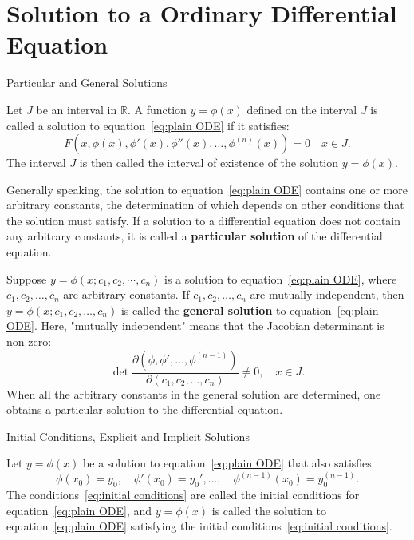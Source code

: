 \documentclass[11pt]{elegantbook}
\begin{document}
\section{Solution to a Ordinary Differential Equation}
\begin{leftbarTitle}{Particular and General Solutions}\end{leftbarTitle}
Let $J$ be an interval in $\mathbb{R}$. 
A function $y=\phi(x)$ defined on the interval $J$ is called a solution to equation~\eqref{eq:plain ODE} if it satisfies: 
\[
F(x, \phi(x), \phi'(x), \phi''(x), \dots, \phi^{(n)}(x)) = 0 \quad x \in J. 
\]
The interval $J$ is then called the interval of existence of the solution $y = \phi(x)$.

Generally speaking, 
the solution to equation~\eqref{eq:plain ODE} contains one or more arbitrary constants, 
the determination of which depends on other conditions that the solution must satisfy. 
If a solution to a differential equation does not contain any arbitrary constants, 
it is called a \textbf{particular solution} of the differential equation.

Suppose $y = \phi(x; c_{1}, c_{2}, \cdots, c_{n})$ is a solution to equation~\eqref{eq:plain ODE}, 
where $c_{1}, c_{2}, \ldots, c_{n}$ are arbitrary constants. 
If $c_{1}, c_{2}, \ldots, c_{n}$ are mutually independent, 
then $y = \phi(x; c_{1}, c_{2}, \ldots, c_{n})$ is called the \textbf{general solution} to equation~\eqref{eq:plain ODE}. 
Here, "mutually independent" means that the Jacobian determinant is non-zero: 
\[
\det \frac{\partial(\phi, \phi', \dots, \phi^{(n-1)})}{\partial(c_1, c_2, \dots, c_n)} \neq 0, \quad x \in J.
\]
When all the arbitrary constants in the general solution are determined, 
one obtains a particular solution to the differential equation.

\begin{leftbarTitle}{Initial Conditions, Explicit and Implicit Solutions}\end{leftbarTitle}
Let $y = \phi(x)$ be a solution to equation~\eqref{eq:plain ODE} that also satisfies 
\begin{equation}\label{eq:initial conditions}
    \phi(x_0) = y_0, \quad \phi'(x_0) = y_0', \dots, \quad \phi^{(n-1)}(x_0) = y_0^{(n-1)}.
\end{equation}
The conditions~\eqref{eq:initial conditions} are called the initial conditions for equation~\eqref{eq:plain ODE}, 
and $y = \phi(x)$ is called the solution to equation~\eqref{eq:plain ODE} satisfying the initial conditions~\eqref{eq:initial conditions}.
\end{document}
